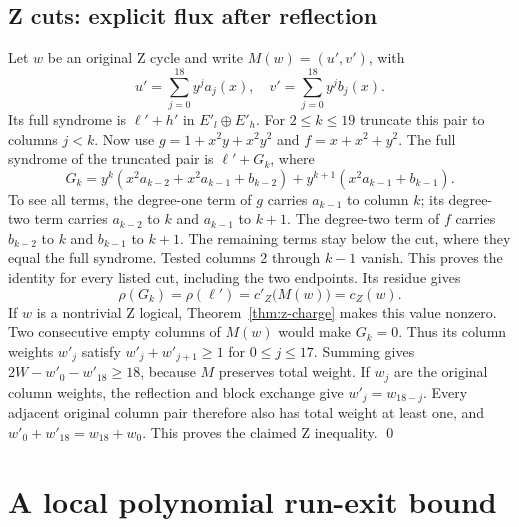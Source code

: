 \documentclass{article}
\begin{document}
\subsection{Z cuts: explicit flux after reflection}\label{sec:z-cuts}

Let \(w\) be an original Z cycle and write \(M(w) = (u', v')\), with
\begin{equation}
  u' = \sum_{j=0}^{18} y^j a_j(x), \quad
  v' = \sum_{j=0}^{18} y^j b_j(x).
\end{equation}
Its full syndrome is \(\ell' + h'\) in \(E'_l \oplus E'_h\). For \(2 \le k \le 19\) truncate
this pair to columns \(j < k\). Now use \(g = 1 + x^2 y + x^2 y^2\) and
\(f = x + x^2 + y^2\). The full syndrome of the truncated pair is \(\ell' + G_k\), where
\begin{equation}
  G_k = y^k (x^2 a_{k-2} + x^2 a_{k-1} + b_{k-2})
  + y^{k+1} (x^2 a_{k-1} + b_{k-1}).
\end{equation}
To see all terms, the degree-one term of \(g\) carries \(a_{k-1}\) to column \(k\); its
degree-two term carries \(a_{k-2}\) to \(k\) and \(a_{k-1}\) to \(k + 1\). The degree-two
term of \(f\) carries \(b_{k-2}\) to \(k\) and \(b_{k-1}\) to \(k + 1\). The remaining terms
stay below the cut, where they equal the full syndrome. Tested columns 2 through \(k - 1\)
vanish. This proves the identity for every listed cut, including the two endpoints. Its
residue gives
\begin{equation}
  \rho(G_k) = \rho(\ell') = c'_Z\bigl(M(w)\bigr) = c_Z(w).
\end{equation}
If \(w\) is a nontrivial Z logical, Theorem~\ref{thm:z-charge} makes this value nonzero. Two
consecutive empty columns of \(M(w)\) would make \(G_k = 0\). Thus its column weights
\(w'_j\) satisfy \(w'_j + w'_{j+1} \ge 1\) for \(0 \le j \le 17\). Summing gives
\(2W - w'_0 - w'_{18} \ge 18\), because \(M\) preserves total weight. If \(w_j\) are the
original column weights, the reflection and block exchange give \(w'_j = w_{18-j}\). Every
adjacent original column pair therefore also has total weight at least one, and
\(w'_0 + w'_{18} = w_{18} + w_0\). This proves the claimed Z inequality. \qed

\section{A local polynomial run-exit bound}\label{sec:run-exit}
\end{document}
